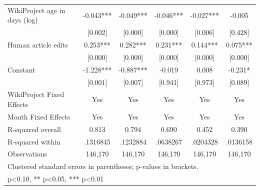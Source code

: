 {\begin{tabular}{l*{5}{c}}
WikiProject age in days (log)&    -0.043***&    -0.049***&    -0.046***&    -0.027***&    -0.005   \\
                    &   [0.002]   &   [0.000]   &   [0.000]   &   [0.006]   &   [0.428]   \\
Human article edits &     0.253***&     0.282***&     0.231***&     0.144***&     0.075***\\
                    &   [0.000]   &   [0.000]   &   [0.000]   &   [0.000]   &   [0.000]   \\
Constant            &    -1.228***&    -0.887***&    -0.019   &     0.008   &    -0.231*  \\
                    &   [0.001]   &   [0.007]   &   [0.941]   &   [0.973]   &   [0.089]   \\
WikiProject Fixed Effects&       Yes   &       Yes   &       Yes   &       Yes   &       Yes   \\
Month Fixed Effects &       Yes   &       Yes   &       Yes   &       Yes   &       Yes   \\
\midrule
R-squared overall   &     0.813   &     0.794   &     0.690   &     0.452   &     0.390   \\
R-squared within    &  .1316845   &  .1232884   &  .0638267   &  .0204328   &  .0136158   \\
Observations        &   146,170   &   146,170   &   146,170   &   146,170   &   146,170   \\
\bottomrule
\multicolumn{6}{l}{\footnotesize Clustered standard errors in parentheses; p-values in brackets.}\\
\multicolumn{6}{l}{\footnotesize * p<0.10, ** p<0.05, *** p<0.01}\\
\end{tabular}
}

